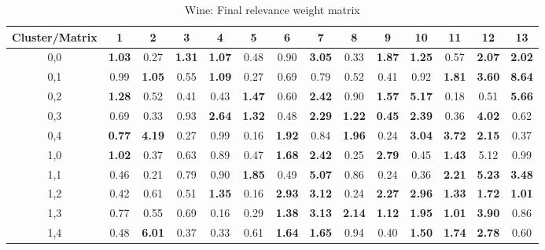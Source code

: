 \documentclass[10pt, conference, compsocconf]{IEEEtran}
\begin{document}
\begin{center}
\begin{table*}[ht]
\renewcommand{\arraystretch}{0.9}
\caption{Wine: Final relevance weight matrix}
\label{wine_pesos}
\centering
\begin{tabular}{|c|c|c|c|c|c|c|c|c|c|c|c|c|c|}
\hline
Cluster/Matrix & 1 & 2 & 3 & 4 & 5 & 6 & 7 & 8 & 9 & 10 & 11 & 12 & 13 \\ \hline
0,0 & \textbf{1.03} & 0.27 & \textbf{1.31} & \textbf{1.07} & 0.48 & 0.90 & \textbf{3.05} & 0.33 & \textbf{1.87} & \textbf{1.25} & 0.57 & \textbf{2.07} & \textbf{2.02} \\ \hline
0,1 & 0.99 & \textbf{1.05} & 0.55 & \textbf{1.09} & 0.27 & 0.69 & 0.79 & 0.52 & 0.41 & 0.92 & \textbf{1.81} & \textbf{3.60} & \textbf{8.64} \\ \hline
0,2 & \textbf{1.28} & 0.52 & 0.41 & 0.43 & \textbf{1.47} & 0.60 & \textbf{2.42} & 0.90 & \textbf{1.57} & \textbf{5.17} & 0.18 & 0.51 & \textbf{5.66} \\ \hline
0,3 & 0.69 & 0.33 & 0.93 & \textbf{2.64} & \textbf{1.32} & 0.48 & \textbf{2.29} & \textbf{1.22} & \textbf{0.45} & \textbf{2.39} & 0.36 & \textbf{4.02} & 0.62 \\ \hline
0,4 & \textbf{0.77} & \textbf{4.19} & 0.27 & 0.99 & 0.16 & \textbf{1.92} & 0.84 & \textbf{1.96} & 0.24 & \textbf{3.04} & \textbf{3.72} & \textbf{2.15} & 0.37 \\ \hline
1,0 & \textbf{1.02} & 0.37 & 0.63 & 0.89 & 0.47 & \textbf{1.68} & \textbf{2.42} & 0.25 & \textbf{2.79} & 0.45 & \textbf{1.43} & 5.12 & 0.99 \\ \hline
1,1 & 0.46 & 0.21 & 0.79 & 0.90 & \textbf{1.85} & 0.49 & \textbf{5.07} & 0.86 & 0.24 & 0.36 & \textbf{2.21} & \textbf{5.23} & \textbf{3.48} \\ \hline
1,2 & 0.42 & 0.61 & 0.51 & \textbf{1.35} & 0.16 & \textbf{2.93} & \textbf{3.12} & 0.24 & \textbf{2.27} & \textbf{2.96} & \textbf{1.33} & \textbf{1.72} & \textbf{1.01} \\ \hline
1,3 & 0.77 & 0.55 & 0.69 & 0.16 & 0.29 & \textbf{1.38} & \textbf{3.13} & \textbf{2.14} & \textbf{1.12} & \textbf{1.95} & \textbf{1.01} & \textbf{3.90} & 0.86 \\ \hline
1,4 & 0.48 & \textbf{6.01} & 0.37 & 0.33 & 0.61 & \textbf{1.64} & \textbf{1.65} & 0.94 & 0.40 & \textbf{1.50} & \textbf{1.74} & \textbf{2.78} & 0.60 \\ \hline

\end{tabular}
\end{table*}
\end{center}
\end{document}
